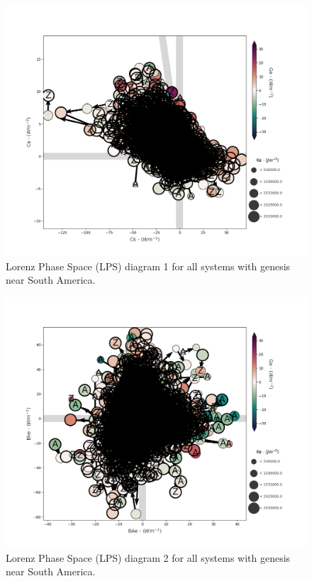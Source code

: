 \begin{figure}[!htbp]
\centering
\includegraphics[width=\textwidth]{figs_6/lps_mixed_all_systems_zoom.png}
\caption[LPS 1 - All Systems]{Lorenz Phase Space (LPS) diagram 1 for all systems with genesis near South America.}
\label{fig:lps_1_all_systems}
\end{figure}

\begin{figure}[!htbp]
\centering
\includegraphics[width=\textwidth]{figs_6/lps_imports_all_systems_zoom.png}
\caption[LPS 1 - All Systems]{Lorenz Phase Space (LPS) diagram 2 for all systems with genesis near South America.}
\label{fig:lps_2_all_systems}
\end{figure}

